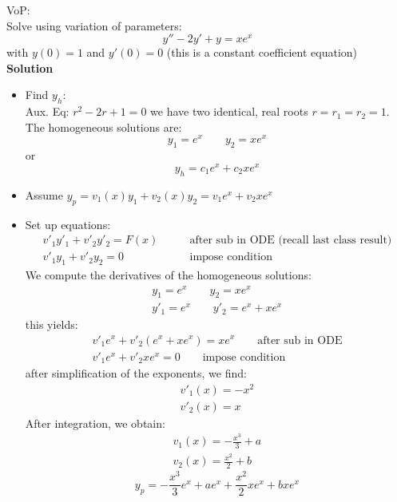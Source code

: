\begin{exmp}{VoP:}\\
Solve using variation of parameters:
\begin {equation*}
y''-2y'+y=xe^x
\end {equation*}
with $y(0)=1$ and $y'(0)=0$
(this is a constant coefficient equation)\\

\textbf{Solution}\\
\begin{itemize}
\item Find $y_h$:\\
Aux. Eq: $r^2-2r+1=0$ we have two identical, real roots $r=r_1=r_2=1$. The homogeneous solutions are:
\begin {equation*}
y_1=e^x \qquad y_2=xe^x
\end {equation*}
or 
\begin {equation*}
\boxed{y_h=c_1e^x +c_2 xe^x}
\end {equation*}
\item Assume $y_p=v_1(x)y_1 + v_2(x) y_2=v_1e^x +v_2 xe^x$
\item Set up equations:
\begin {align*}
v'_1y'_1 + v'_2 y'_2=F(x) \qquad &\text{after sub in ODE (recall last class result)}\\
v'_1y_1 + v'_2 y_2=0 \qquad &\text{impose condition}
\end {align*}
We compute the derivatives of the homogeneous solutions:
\begin {align*}
y_1 = e^x \qquad y_2 = xe^x\\
y'_1 = e^x \qquad y'_2 = e^x+xe^x
\end {align*}
this yields:
\begin {align*}
v'_1e^x + v'_2 (e^x+xe^x)=xe^x \qquad \text{after sub in ODE}\\
v'_1e^x + v'_2 xe^x=0 \qquad \text{impose condition}
\end {align*}
after simplification of the exponents, we find:
\begin {align*}
v'_1(x)=-x^2\\
v'_2(x)=x
\end {align*}
After integration, we obtain:
\begin {align*}
v_1(x)=-\frac{x^3}{3}+a\\
v_2(x)=\frac{x^2}{2}+b
\end {align*}
\begin {equation*}
\boxed{y_p=-\frac{x^3}{3}e^x +ae^x +\frac{x^2}{2}xe^x+bxe^x}

\end{equation*}
\end{itemize}
\end{exmp}
